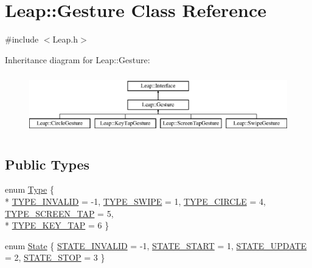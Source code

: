 \hypertarget{class_leap_1_1_gesture}{\section{Leap\+:\+:Gesture Class Reference}
\label{class_leap_1_1_gesture}
}


{\ttfamily \#include $<$Leap.\+h$>$}

Inheritance diagram for Leap\+:\+:Gesture\+:\begin{figure}[H]
\begin{center}
\leavevmode
\includegraphics[height=2.625000cm]{class_leap_1_1_gesture}
\end{center}
\end{figure}
\subsection*{Public Types}
\begin{DoxyCompactItemize}
\item 
enum \hyperlink{class_leap_1_1_gesture_a6fa6dd4f28c502f0d55abc6b71c6f9b1}{Type} \{ \\*
\hyperlink{class_leap_1_1_gesture_a6fa6dd4f28c502f0d55abc6b71c6f9b1a743fdf6ff0a893a5b7bf6a56739af618}{T\+Y\+P\+E\+\_\+\+I\+N\+V\+A\+L\+I\+D} = -\/1, 
\hyperlink{class_leap_1_1_gesture_a6fa6dd4f28c502f0d55abc6b71c6f9b1a0845a054bc76e298900d3bd735d26c9c}{T\+Y\+P\+E\+\_\+\+S\+W\+I\+P\+E} = 1, 
\hyperlink{class_leap_1_1_gesture_a6fa6dd4f28c502f0d55abc6b71c6f9b1a32c2a26d674d97f9c9b2e72569ff6869}{T\+Y\+P\+E\+\_\+\+C\+I\+R\+C\+L\+E} = 4, 
\hyperlink{class_leap_1_1_gesture_a6fa6dd4f28c502f0d55abc6b71c6f9b1aa099d1aa238c369e5b2519f2aaca2218}{T\+Y\+P\+E\+\_\+\+S\+C\+R\+E\+E\+N\+\_\+\+T\+A\+P} = 5, 
\\*
\hyperlink{class_leap_1_1_gesture_a6fa6dd4f28c502f0d55abc6b71c6f9b1a4db232d45dfde82ff0c319f623cc3471}{T\+Y\+P\+E\+\_\+\+K\+E\+Y\+\_\+\+T\+A\+P} = 6
 \}
\item 
enum \hyperlink{class_leap_1_1_gesture_a068c6f3ba05970dc557b62a366073578}{State} \{ \hyperlink{class_leap_1_1_gesture_a068c6f3ba05970dc557b62a366073578a6a15c3a18402c69bd711b58e6dea5d93}{S\+T\+A\+T\+E\+\_\+\+I\+N\+V\+A\+L\+I\+D} = -\/1, 
\hyperlink{class_leap_1_1_gesture_a068c6f3ba05970dc557b62a366073578aae7d6cacedcd2850cdea7d9f2dfd33a4}{S\+T\+A\+T\+E\+\_\+\+S\+T\+A\+R\+T} = 1, 
\hyperlink{class_leap_1_1_gesture_a068c6f3ba05970dc557b62a366073578ac8600576e553a806c9c4a337e5cee473}{S\+T\+A\+T\+E\+\_\+\+U\+P\+D\+A\+T\+E} = 2, 
\hyperlink{class_leap_1_1_gesture_a068c6f3ba05970dc557b62a366073578a4cfb4482ef179e4527c15188328b894f}{S\+T\+A\+T\+E\+\_\+\+S\+T\+O\+P} = 3
 \}
\end{DoxyCompactItemize}
